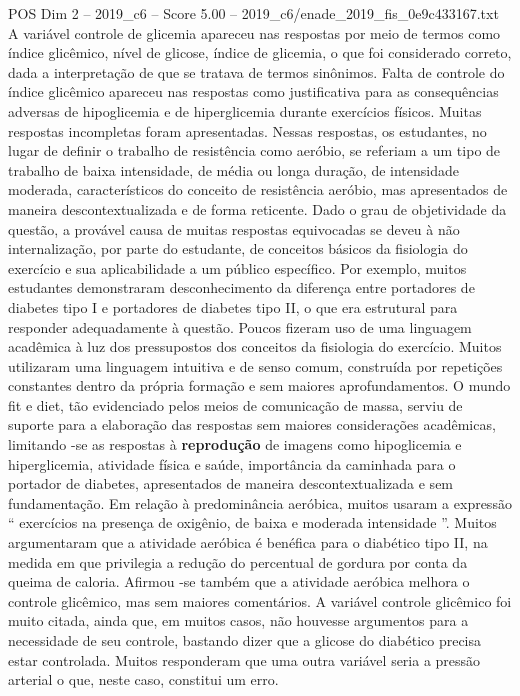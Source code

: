 \begin{textsample}{POS Dim 2 – 2019\_c6 – Score 5.00 – 2019\_c6/enade\_2019\_fis\_0e9c433167.txt}
A variável controle de glicemia apareceu nas respostas por meio de termos como índice glicêmico, nível de glicose, índice de glicemia, o que foi considerado correto, dada a interpretação de que se tratava de termos sinônimos.
Falta de controle do índice glicêmico apareceu nas respostas como justificativa para as consequências adversas de hipoglicemia e de hiperglicemia durante exercícios físicos.
Muitas respostas incompletas foram apresentadas.
Nessas respostas, os estudantes, no lugar de definir o trabalho de resistência como aeróbio, se referiam a um tipo de trabalho de baixa intensidade, de média ou longa duração, de intensidade moderada, característicos do conceito de resistência aeróbio, mas apresentados de maneira descontextualizada e de forma reticente.
Dado o grau de objetividade da questão, a provável causa de muitas respostas equivocadas se deveu à não internalização, por parte do estudante, de conceitos básicos da fisiologia do exercício e sua aplicabilidade a um público específico.
Por exemplo, muitos estudantes demonstraram desconhecimento da diferença entre portadores de diabetes tipo I e portadores de diabetes tipo II, o que era estrutural para responder adequadamente à questão.
Poucos fizeram uso de uma linguagem acadêmica à luz dos pressupostos dos conceitos da fisiologia do exercício.
Muitos utilizaram uma linguagem intuitiva e de senso comum, construída por repetições constantes dentro da própria formação e sem maiores aprofundamentos.
O mundo fit e diet, tão evidenciado pelos meios de comunicação de massa, serviu de suporte para a elaboração das respostas sem maiores considerações acadêmicas, limitando -se as respostas à \textbf{reprodução} de imagens como hipoglicemia e hiperglicemia, atividade física e saúde, importância da caminhada para o portador de diabetes, apresentados de maneira descontextualizada e sem fundamentação.
Em relação à predominância aeróbica, muitos usaram a expressão “ exercícios na presença de oxigênio, de baixa e moderada intensidade ”.
Muitos argumentaram que a atividade aeróbica é benéfica para o diabético tipo II, na medida em que privilegia a redução do percentual de gordura por conta da queima de caloria.
Afirmou -se também que a atividade aeróbica melhora o controle glicêmico, mas sem maiores comentários.
A variável controle glicêmico foi muito citada, ainda que, em muitos casos, não houvesse argumentos para a necessidade de seu controle, bastando dizer que a glicose do diabético precisa estar controlada.
Muitos responderam que uma outra variável seria a pressão arterial o que, neste caso, constitui um erro.

\end{textsample}
